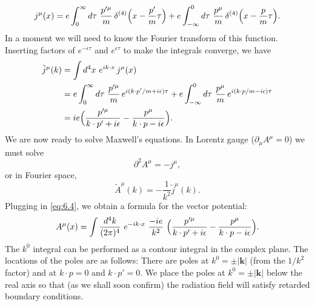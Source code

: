 \begin{equation}
  j^\mu(x) = e\int_0^{\infty} d\tau\ \frac{p'^{\mu}}{m}\,
    \delta^{(4)}\Bigl( x - \frac{p'}{m}\tau \Bigr)
    + e\int_{-\infty}^{0} d\tau\ \frac{p^{\mu}}{m}\,
      \delta^{(4)}\Bigl( x - \frac{p}{m}\tau \Bigr).
\end{equation}
In a moment we will need to know the Fourier transform of this function.
Inserting factors of $e^{-\epsilon\tau}$ and $e^{\epsilon\tau}$ to make the
integrals converge, we have
\begin{equation}
  \begin{aligned}
    \tilde{j}^\mu(k) &= \int d^4x\ e^{ik\cdot x}\,j^\mu(x)\\
    &= e\int_0^{\infty} d\tau\ \frac{p'^{\mu}}{m}\,
      e^{i(k\cdot p'/m+i\epsilon)\tau}
      + e\int_{-\infty}^{0} d\tau\ \frac{p^{\mu}}{m}\,
        e^{i(k\cdot p/m-i\epsilon)\tau}\\
    &= ie\Bigl( \frac{p'^{\mu}}{k\cdot p' + i\epsilon}
      - \frac{p^{\mu}}{k\cdot p - i\epsilon} \Bigr).
  \end{aligned}
  \label{eq:6.4}
\end{equation}
We are now ready to solve Maxwell's equations.  In Lorentz gauge
($\partial_\mu A^\mu = 0$) we must solve
\begin{equation}
  \partial^2 A^\mu = -j^\mu,
\end{equation}
or in Fourier space,
\begin{equation}
  \tilde{A}^\mu(k) = -\frac{1}{k^2}\tilde{j}^\mu(k) .
\end{equation}
Plugging in \eqref{eq:6.4}, we obtain a formula for the vector potential:
\begin{equation}
  A^\mu(x) = \int \frac{d^4k}{(2\pi)^4}\ e^{-ik\cdot x}\
    \frac{-ie}{k^2}\ \Bigl( \frac{p'^{\mu}}{k\cdot p' + i\epsilon}
      - \frac{p^{\mu}}{k\cdot p - i\epsilon} \Bigr).
  \label{eq:6.5}
\end{equation}
The $k^0$ integral can be performed as a contour integral in the complex
plane.  The locations of the poles are as follows: There are poles at
$k^0 = \pm|\mathbf{k}|$ (from the $1/k^2$ factor) and at
$k\cdot p = 0$ and $k\cdot p' = 0$.  We place the poles at
$k^0 = \pm|\mathbf{k}|$ below the real axis so that (as we shall soon confirm)
the radiation field will satisfy retarded boundary conditions.

